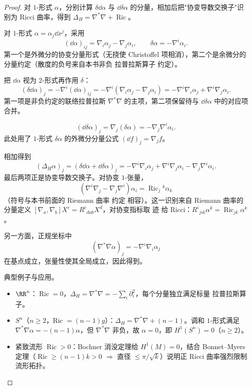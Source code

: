 \begin{proof}
对 $1$-形式 $\alpha$，分别计算 $\delta\dd\alpha$ 与 $\dd\delta\alpha$ 的分量，相加后把"协变导数交换子"识别为 Ricci 曲率，得到 $\Delta_H=\nabla^*\nabla+\operatorname{Ric}$。

对 $1$-形式 $\alpha=\alpha_j\dd x^j$，采用
\begin{equation*}
(\dd\alpha)_{ij}
=\nabla_i\alpha_j-\nabla_j\alpha_i,
\qquad
\delta\alpha=-\nabla^i\alpha_i.
\end{equation*}
第一个是外微分的协变分量形式（无挠使 Christoffel 项相消），第二个是余微分的分量约定（散度的负号来自本书非负 拉普拉斯算子 约定）。

把 $\dd\alpha$ 视为 $2$-形式再作用 $\delta$：
\begin{equation*}
(\delta\dd\alpha)_j
=-\nabla^i(\dd\alpha)_{ij}
=-\nabla^i(\nabla_i\alpha_j-\nabla_j\alpha_i)
=-\nabla^i\nabla_i\alpha_j+\nabla^i\nabla_j\alpha_i.
\end{equation*}
第一项是非负约定的联络拉普拉斯 $\nabla^*\nabla$ 的主项，第二项保留待与 $\dd\delta\alpha$ 中的对应项合并。


\begin{equation*}
(\dd\delta\alpha)_j
=\nabla_j(\delta\alpha)
=-\nabla_j\nabla^i\alpha_i.
\end{equation*}
此处用了 $1$-形式 $\delta\alpha$ 的外微分分量公式 $(\dd f)_j=\nabla_j f$。

相加得到
\begin{equation*}
(\Delta_H\alpha)_j
=(\delta\dd\alpha+\dd\delta\alpha)_j
=-\nabla^i\nabla_i\alpha_j
+\nabla^i\nabla_j\alpha_i
-\nabla_j\nabla^i\alpha_i.
\end{equation*}
最后两项正是协变导数交换子。对协变 $1$-张量，
\begin{equation*}
(\nabla^i\nabla_j-\nabla_j\nabla^i)\alpha_i
=\operatorname{Ric}_j{}^k\alpha_k
\end{equation*}
（符号与本书前面的 Riemann 曲率 约定 相容）。这一识别来自 Riemann 曲率的分量定义 $[\nabla_a,\nabla_b]X^c=R^c{}_{dab}X^d$，对协变指标取 迹 给 Ricci：$R^i{}_{j i k}\alpha^k=\operatorname{Ric}_{jk}\alpha^k$。

另一方面，正规坐标中
\begin{equation*}
(\nabla^*\nabla\alpha)_j
=-\nabla^i\nabla_i\alpha_j
\end{equation*}
在基点成立，张量性使其全局成立，因此得到。

典型例子与应用。
\begin{itemize}
\item $\RR^n$：$\operatorname{Ric}=0$，$\Delta_H=\nabla^*\nabla=-\sum_i\partial_i^2$，每个分量独立满足标量 拉普拉斯算子。
\item $S^n$（$n\ge2$，Ric $=(n-1)g$）：$\Delta_H=\nabla^*\nabla+(n-1)$。调和 $1$-形式满足 $\nabla^*\nabla\alpha=-(n-1)\alpha$，但 $\nabla^*\nabla$ 非负，故 $\alpha=0$，即 $H^1(S^n)=0$（$n\ge2$）。
\item 紧致流形 $\operatorname{Ric}>0$：Bochner 消没定理给 $H^1(M)=0$，结合 Bonnet--Myers 定理（$\operatorname{Ric}\ge(n-1)k>0$ $\Rightarrow$ 直径 $\le\pi/\sqrt{k}$）说明正 Ricci 曲率强烈限制流形拓扑。
\end{itemize}


\end{proof}
